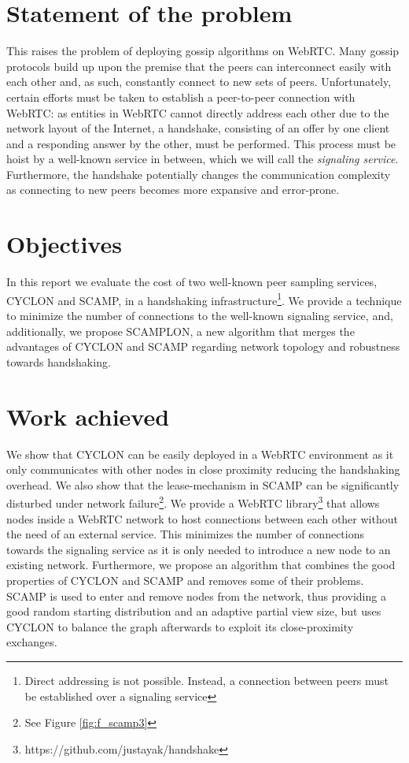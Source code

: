 \documentclass[11pt, english, screen]{report-rd-info}
\begin{document}
\section{Statement of the problem}

This raises the problem of deploying gossip algorithms on WebRTC.
Many gossip protocols build up upon the premise that the peers can interconnect easily with each other and, as such, constantly connect to new sets of peers\cite{Voulgaris05cyclon:inexpensive}\cite{Jelasity:2004:PSS:1045658.1045666}.
Unfortunately, certain efforts must be taken to establish a peer-to-peer connection with WebRTC:
as entities in WebRTC cannot directly address each other due to the network layout of the Internet, a handshake, consisting of an offer by one client and a responding answer by the other, must be performed.
This process must be hoist by a well-known service in between, which we will call the \emph{signaling service}.
Furthermore, the handshake potentially changes the communication complexity as connecting to new peers becomes more expansive and error-prone.

\section{Objectives}

In this report we evaluate the cost of two well-known peer sampling services, CYCLON\cite{Voulgaris05cyclon:inexpensive} and SCAMP\cite{Ganesh:2001:SPL:648089.747488}, in a handshaking infrastructure\footnote{Direct addressing is not possible. Instead, a connection between peers must be established over a signaling service}.
We provide a technique to minimize the number of connections to the well-known signaling service, and, 
additionally, we propose SCAMPLON, a new algorithm that merges the advantages of CYCLON and SCAMP regarding network topology and robustness towards handshaking.

\section{Work achieved}

We show that CYCLON can be easily deployed in a WebRTC environment as it only communicates with other nodes in close proximity reducing the handshaking overhead.
We also show that the lease-mechanism in SCAMP can be significantly disturbed under network failure\footnote{See Figure \ref{fig:f_scamp3}}.
We provide a WebRTC library\footnote{https://github.com/justayak/handshake} that allows nodes inside a WebRTC network to host connections between each other without the need of an external service. This minimizes the number of connections towards the signaling service as it is only needed to introduce a new node to an existing network.
Furthermore, we propose an algorithm that combines the good properties of CYCLON and SCAMP and removes some of their problems.
SCAMP is used to enter and remove nodes from the network, thus providing a good random starting distribution and an adaptive partial view size, but uses CYCLON to balance the graph afterwards to exploit its close-proximity exchanges.
\end{document}
